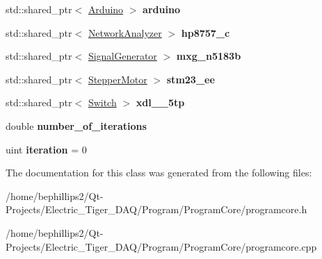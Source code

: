 \begin{DoxyCompactItemize}
\item 
std\+::shared\+\_\+ptr$<$ \hyperlink{class_arduino}{Arduino} $>$ {\bfseries arduino}\hypertarget{class_program_core_a78ddd529b15d3452ad0c4d6f6ee945df}{}\label{class_program_core_a78ddd529b15d3452ad0c4d6f6ee945df}

\item 
std\+::shared\+\_\+ptr$<$ \hyperlink{class_network_analyzer}{Network\+Analyzer} $>$ {\bfseries hp8757\+\_\+c}\hypertarget{class_program_core_a2758baf2c1575433d9e2899d808ecd85}{}\label{class_program_core_a2758baf2c1575433d9e2899d808ecd85}

\item 
std\+::shared\+\_\+ptr$<$ \hyperlink{class_signal_generator}{Signal\+Generator} $>$ {\bfseries mxg\+\_\+n5183b}\hypertarget{class_program_core_a12b09ed70d378ec6f11c149702324877}{}\label{class_program_core_a12b09ed70d378ec6f11c149702324877}

\item 
std\+::shared\+\_\+ptr$<$ \hyperlink{class_stepper_motor}{Stepper\+Motor} $>$ {\bfseries stm23\+\_\+ee}\hypertarget{class_program_core_a02890f6396a1ab39360e554de6894088}{}\label{class_program_core_a02890f6396a1ab39360e554de6894088}

\item 
std\+::shared\+\_\+ptr$<$ \hyperlink{class_switch}{Switch} $>$ {\bfseries xdl\+\_\+\_\+5tp}\hypertarget{class_program_core_a99fc8b72279b1206486f89f907bf124c}{}\label{class_program_core_a99fc8b72279b1206486f89f907bf124c}

\item 
double {\bfseries number\+\_\+of\+\_\+iterations}\hypertarget{class_program_core_a8a560989bfdd86e7c16390a118f6deb4}{}\label{class_program_core_a8a560989bfdd86e7c16390a118f6deb4}

\item 
uint {\bfseries iteration} = 0\hypertarget{class_program_core_a81d16e3dd7d152daf1fa36dd21f9636e}{}\label{class_program_core_a81d16e3dd7d152daf1fa36dd21f9636e}

\end{DoxyCompactItemize}


The documentation for this class was generated from the following files\+:\begin{DoxyCompactItemize}
\item 
/home/bephillips2/\+Qt-\/\+Projects/\+Electric\+\_\+\+Tiger\+\_\+\+D\+A\+Q/\+Program/\+Program\+Core/programcore.\+h\item 
/home/bephillips2/\+Qt-\/\+Projects/\+Electric\+\_\+\+Tiger\+\_\+\+D\+A\+Q/\+Program/\+Program\+Core/programcore.\+cpp\end{DoxyCompactItemize}
